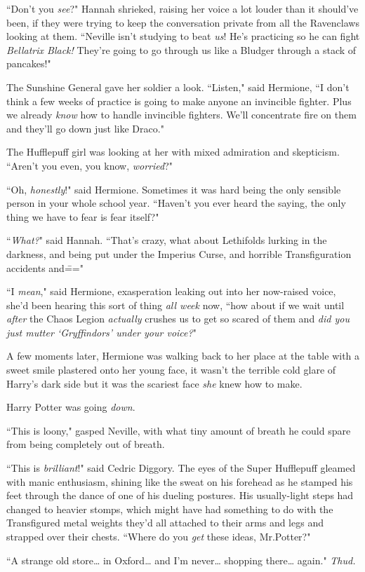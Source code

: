 ``Don't you \emph{see}?" Hannah shrieked, raising her voice a lot louder than it should've been, if they were trying to keep the conversation private from all the Ravenclaws looking at them. ``Neville isn't studying to beat \emph{us}! He's practicing so he can fight \emph{Bellatrix Black!} They're going to go through us like a Bludger through a stack of pancakes!"

The Sunshine General gave her soldier a look. ``Listen," said Hermione, ``I don't think a few weeks of practice is going to make anyone an invincible fighter. Plus we already \emph{know} how to handle invincible fighters. We'll concentrate fire on them and they'll go down just like Draco."

The Hufflepuff girl was looking at her with mixed admiration and skepticism. ``Aren't you even, you know, \emph{worried}?"

``Oh, \emph{honestly}!" said Hermione. Sometimes it was hard being the only sensible person in your whole school year. ``Haven't you ever heard the saying, the only thing we have to fear is fear itself?"

``\emph{What?}" said Hannah. ``That's crazy, what about Lethifolds lurking in the darkness, and being put under the Imperius Curse, and horrible Transfiguration accidents and\==="

``I \emph{mean}," said Hermione, exasperation leaking out into her now-raised voice, she'd been hearing this sort of thing \emph{all week} now, ``how about if we wait until \emph{after} the Chaos Legion \emph{actually} crushes us to get so scared of them and \emph{did you just mutter `Gryffindors' under your voice?}"

A few moments later, Hermione was walking back to her place at the table with a sweet smile plastered onto her young face, it wasn't the terrible cold glare of Harry's dark side but it was the scariest face \emph{she} knew how to make.

Harry Potter was going \emph{down}.

\later

``This is loony," gasped Neville, with what tiny amount of breath he could spare from being completely out of breath.

``This is \emph{brilliant}!" said Cedric Diggory. The eyes of the Super Hufflepuff gleamed with manic enthusiasm, shining like the sweat on his forehead as he stamped his feet through the dance of one of his dueling postures. His usually-light steps had changed to heavier stomps, which might have had something to do with the Transfigured metal weights they'd all attached to their arms and legs and strapped over their chests. ``Where do you \emph{get} these ideas, Mr.\?Potter?"

``A strange old store{\ldots} in Oxford{\ldots} and I'm never{\ldots} shopping there{\ldots} again." \emph{Thud.}

